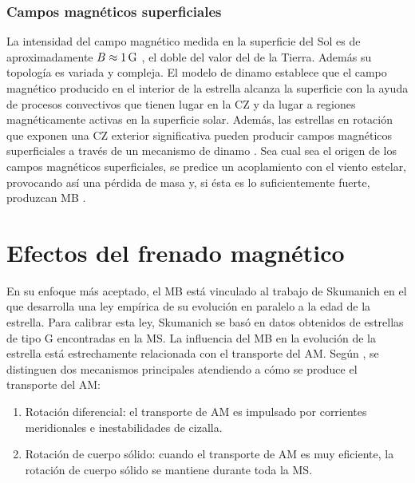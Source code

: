 \subsubsection{Campos magnéticos superficiales} \label{surf_mf}
La intensidad del campo magnético medida en la superficie del Sol es de aproximadamente $B\approx1\,\mathrm{G}$ \cite{Weber1967,DAntona2000,Morin2012}, el doble del valor del de la Tierra. Además su topología es variada y compleja. El modelo de dinamo establece que el campo magnético producido en el interior de la estrella alcanza la superficie con la ayuda de procesos convectivos que tienen lugar en la CZ y da lugar a regiones magnéticamente activas en la superficie solar. Además, las estrellas en rotación que exponen una CZ exterior significativa pueden producir campos magnéticos superficiales a través de un mecanismo de dinamo \cite[v.g.][]{Brandenburg2004,Charbonneau2010,Brun2017}. Sea cual sea el origen de los campos magnéticos superficiales, se predice un acoplamiento con el viento estelar, provocando así una pérdida de masa y, si ésta es lo suficientemente fuerte, produzcan MB \cite[v.g.][]{UdDoula2002,Ud-Doula2007,Ud-Doula2008,Meynet2010}.\par


\section{Efectos del frenado magnético}
En su enfoque más aceptado, el MB está vinculado al trabajo de Skumanich \cite{Skumanich1972} en el que desarrolla una ley empírica de su evolución en paralelo a la edad de la estrella. Para calibrar esta ley, Skumanich se basó en datos obtenidos de estrellas de tipo G encontradas en la MS. La influencia del MB en la evolución de la estrella está estrechamente relacionada con el transporte del AM. Según \cite{Meynet2010}, se distinguen dos mecanismos principales atendiendo a cómo se produce el transporte del AM:

\begin{enumerate}
    \item Rotación diferencial: el transporte de AM es impulsado por corrientes meridionales e inestabilidades de cizalla.
    \item Rotación de cuerpo sólido: cuando el transporte de AM es muy eficiente, la rotación de cuerpo sólido se mantiene durante toda la MS.
\end{enumerate}


